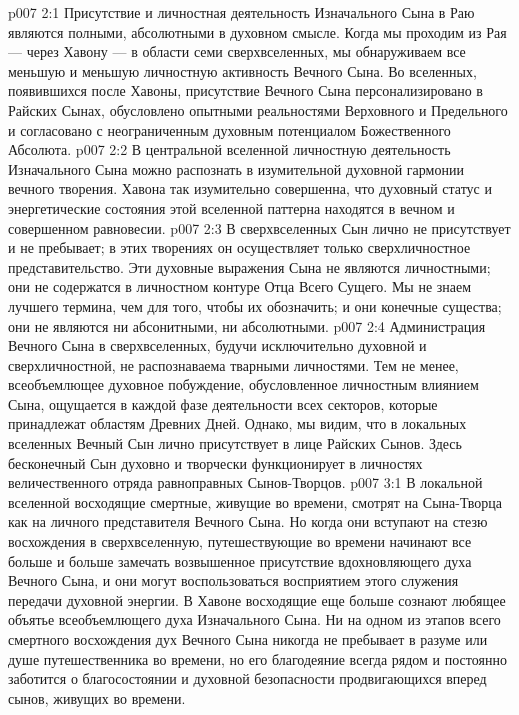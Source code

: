 \vs p007 2:1 Присутствие и личностная деятельность Изначального Сына в Раю являются полными, абсолютными в духовном смысле. Когда мы проходим из Рая --- через Хавону --- в области семи сверхвселенных, мы обнаруживаем все меньшую и меньшую личностную активность Вечного Сына. Во вселенных, появившихся после Хавоны, присутствие Вечного Сына персонализировано в Райских Сынах, обусловлено опытными реальностями Верховного и Предельного и согласовано с неограниченным духовным потенциалом Божественного Абсолюта.
\vs p007 2:2 В центральной вселенной личностную деятельность Изначального Сына можно распознать в изумительной духовной гармонии вечного творения. Хавона так изумительно совершенна, что духовный статус и энергетические состояния этой вселенной паттерна находятся в вечном и совершенном равновесии.
\vs p007 2:3 В сверхвселенных Сын лично не присутствует и не пребывает; в этих творениях он осуществляет только сверхличностное представительство. Эти духовные выражения Сына не являются личностными; они не содержатся в личностном контуре Отца Всего Сущего. Мы не знаем лучшего термина, чем  для того, чтобы их обозначить; и они конечные существа; они не являются ни абсонитными, ни абсолютными.
\vs p007 2:4 Администрация Вечного Сына в сверхвселенных, будучи исключительно духовной и сверхличностной, не распознаваема тварными личностями. Тем не менее, всеобъемлющее духовное побуждение, обусловленное личностным влиянием Сына, ощущается в каждой фазе деятельности всех секторов, которые принадлежат областям Древних Дней. Однако, мы видим, что в локальных вселенных Вечный Сын лично присутствует в лице Райских Сынов. Здесь бесконечный Сын духовно и творчески функционирует в личностях величественного отряда равноправных Сынов\hyp{}Творцов.
\vs p007 3:1 В локальной вселенной восходящие смертные, живущие во времени, смотрят на Сына\hyp{}Творца как на личного представителя Вечного Сына. Но когда они вступают на стезю восхождения в сверхвселенную, путешествующие во времени начинают все больше и больше замечать возвышенное присутствие вдохновляющего духа Вечного Сына, и они могут воспользоваться восприятием этого служения передачи духовной энергии. В Хавоне восходящие еще больше сознают любящее объятье всеобъемлющего духа Изначального Сына. Ни на одном из этапов всего смертного восхождения дух Вечного Сына никогда не пребывает в разуме или душе путешественника во времени, но его благодеяние всегда рядом и постоянно заботится о благосостоянии и духовной безопасности продвигающихся вперед сынов, живущих во времени.
